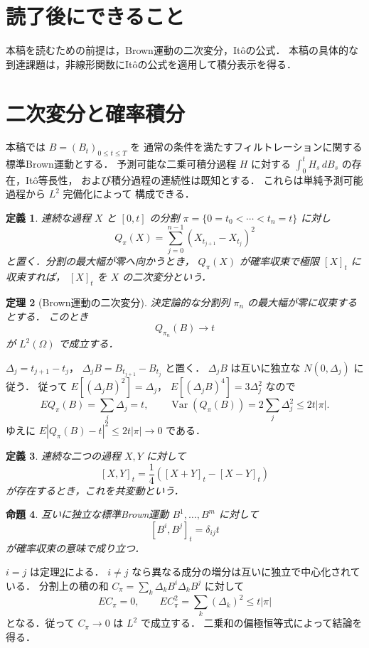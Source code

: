\documentclass[a5paper,10pt,onecolumn]{jsarticle}
\makeatletter
\theoremstyle{mathnotetheorem}
\newtheorem{theorem}{定理}[section]
\newtheorem{definition}[theorem]{定義}
\newtheorem{proposition}[theorem]{命題}
\renewcommand{\proofname}{証明}
\renewenvironment{proof}[1][\proofname]{%
  \par\pushQED{\qed}\normalfont\topsep4\p@\@plus2\p@\relax
  \trivlist\item[\hskip\labelsep\bfseries #1]\ignorespaces
}{\popQED\endtrivlist\@endpefalse}
\makeatother
\begin{document}
\section*{読了後にできること}
本稿を読むための前提は，Brown運動の二次変分，Itôの公式．
本稿の具体的な到達課題は，非線形関数にItôの公式を適用して積分表示を得る．

\section{二次変分と確率積分}

本稿では $B=(B_t)_{0\le t\le T}$ を
通常の条件を満たすフィルトレーションに関する
標準Brown運動とする．
予測可能な二乗可積分過程 $H$ に対する
$\int_0^tH_s\,dB_s$ の存在，It\^o等長性，
および積分過程の連続性は既知とする．
これらは単純予測可能過程から $L^2$ 完備化によって
構成できる．

\begin{definition}
連続な過程 $X$ と $[0,t]$ の分割
$\pi=\{0=t_0<\cdots<t_n=t\}$ に対し
\[
 Q_\pi(X)=\sum_{j=0}^{n-1}(X_{t_{j+1}}-X_{t_j})^2
\]
と置く．分割の最大幅が零へ向かうとき，
$Q_\pi(X)$ が確率収束で極限 $[X]_t$ に収束すれば，
$[X]_t$ を $X$ の\emph{二次変分}という．
\end{definition}

\begin{theorem}[Brown運動の二次変分]\label{thm:brown-qv}
決定論的な分割列 $\pi_n$ の最大幅が零に収束するとする．
このとき
\[
 Q_{\pi_n}(B)\longrightarrow t
\]
が $L^2(\Omega)$ で成立する．
\end{theorem}
\begin{proof}
$\Delta_j=t_{j+1}-t_j$，
$\Delta_jB=B_{t_{j+1}}-B_{t_j}$ と置く．
$\Delta_jB$ は互いに独立な $N(0,\Delta_j)$ に従う．
従って $E[(\Delta_jB)^2]=\Delta_j$，
$E[(\Delta_jB)^4]=3\Delta_j^2$ なので
\[
 E Q_\pi(B)=\sum_j\Delta_j=t,\qquad
 \operatorname{Var}(Q_\pi(B))=2\sum_j\Delta_j^2
 \le2t|\pi|.
\]
ゆえに
$E|Q_\pi(B)-t|^2\le2t|\pi|\to0$ である．
\end{proof}

\begin{definition}
連続な二つの過程 $X,Y$ に対して
\[
 [X,Y]_t=\frac14([X+Y]_t-[X-Y]_t)
\]
が存在するとき，これを共変動という．
\end{definition}

\begin{proposition}\label{prop:covar-bm}
互いに独立な標準Brown運動
$B^1,\dots,B^m$ に対して
\[
 [B^i,B^j]_t=\delta_{ij}t
\]
が確率収束の意味で成り立つ．
\end{proposition}
\begin{proof}
$i=j$ は定理\ref{thm:brown-qv}による．
$i\ne j$ なら異なる成分の増分は互いに独立で中心化されている．
分割上の積の和
$C_\pi=\sum_k\Delta_kB^i\Delta_kB^j$ に対して
\[
 E C_\pi=0,\qquad
 E C_\pi^2=\sum_k(\Delta_k)^2\le t|\pi|
\]
となる．従って $C_\pi\to0$ は $L^2$ で成立する．
二乗和の偏極恒等式によって結論を得る．
\end{proof}
\end{document}
